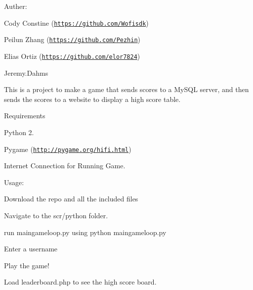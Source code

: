 Auther\+:

Cody Constine (\href{https://github.com/Wofisdk}{\tt https\+://github.\+com/\+Wofisdk})

Peilun Zhang (\href{https://github.com/Pezhin}{\tt https\+://github.\+com/\+Pezhin})

Elias Ortiz (\href{https://github.com/elor7824}{\tt https\+://github.\+com/elor7824})

Jeremy.\+Dahms

This is a project to make a game that sends scores to a My\+S\+QL server, and then sends the scores to a website to display a high score table.

Requirements

Python 2.

Pygame (\href{http://pygame.org/hifi.html}{\tt http\+://pygame.\+org/hifi.\+html})

Internet Connection for Running Game.

Usage\+:

Download the repo and all the included files

Navigate to the scr/python folder.

run maingameloop.\+py using python maingameloop.\+py

Enter a username

Play the game!

Load leaderboard.\+php to see the high score board. 
